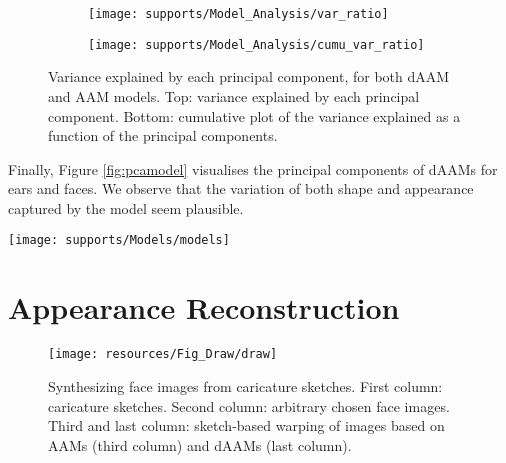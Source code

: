 \begin{figure}[!t]
    \centering
    \begin{subfigure}[b]{0.43\textwidth}
            \texttt{[image: supports/Model\_Analysis/var\_ratio]}
    \end{subfigure}
    \begin{subfigure}[b]{0.43\textwidth}
            \texttt{[image: supports/Model\_Analysis/cumu\_var\_ratio]}
    \end{subfigure}
    \caption{Variance explained by each principal component, for both dAAM and AAM models. Top: variance explained by each principal component. Bottom: cumulative plot of the variance explained as a function of the principal components.}
    \label{fig:compact}
\end{figure}

Finally, Figure \ref{fig:pcamodel} visualises the principal components of dAAMs for ears and faces. We observe that the variation of both shape and appearance captured by the model seem plausible.

\begin{figure*}[!t]
\centering
\texttt{[image: supports/Models/models]}
\caption{Principal components of dAAMs built on ears (top) and faces (bottom). The mean (middle columns) as well as the first five principal components are visualised for both shape (left) and appearance (right). $\pm 3$ times the variance of the corresponding component is used in each case.}
\label{fig:pcamodel}
\end{figure*}




\section{Appearance Reconstruction}
\label{sec:reconstruct}

\begin{figure}[!b]
    \centering
    \texttt{[image: resources/Fig\_Draw/draw]}
    \caption{Synthesizing face images from caricature sketches. First column: caricature sketches. Second column: arbitrary chosen face images. Third and last column: sketch-based warping of images based on AAMs (third column) and dAAMs (last column).}
    \label{fig:draw}
\end{figure}

